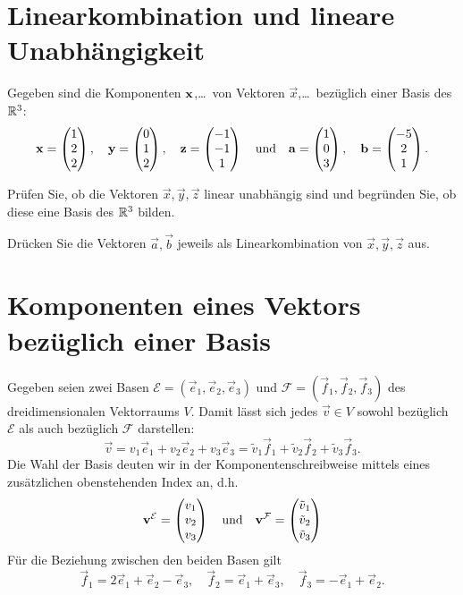 \documentclass{scrartcl}
\newcommand{\ee}{\vec{e}}
\newcommand{\ff}{\vec{f}}
\begin{document}
\section{Linearkombination und lineare Unabhängigkeit }
Gegeben sind die Komponenten $\mathbf{x}$,\ldots\ von Vektoren $\vec{x}$,\ldots\ bezüglich einer Basis des $\mathbb{R}^3$:
\[
  \mathbf{x} = \begin{pmatrix} 1 \\ 2 \\ 2 \end{pmatrix}, \quad
  \mathbf{y} = \begin{pmatrix} 0 \\ 1 \\ 2 \end{pmatrix}, \quad
  \mathbf{z} = \begin{pmatrix} -1 \\ -1 \\ 1 \end{pmatrix} \quad \textrm{und} \quad
  \mathbf{a} = \begin{pmatrix} 1 \\ 0 \\ 3 \end{pmatrix}, \quad
  \mathbf{b} = \begin{pmatrix} -5 \\ 2 \\ 1 \end{pmatrix}.
\]
\begin{subex}
   \item{} Prüfen Sie, ob die Vektoren $\vec{x} , \vec{y} , \vec{z}$ linear unabhängig sind und begründen Sie, ob diese eine Basis des $\mathbb{R}^3$ bilden.
   \item{} Drücken Sie die Vektoren $\vec{a}, \vec{b}$ jeweils als Linearkombination von $\vec{x} , \vec{y} , \vec{z}$ aus.
 \end{subex}



\section{Komponenten eines Vektors bezüglich einer Basis }
Gegeben seien zwei Basen $\mathcal{E} = (\ee_1, \ee_2, \ee_3)$ und $\mathcal{F} = (\ff_1,\ff_2,\ff_3)$ des dreidimensionalen Vektorraums $V$.
Damit lässt sich jedes $\vec{v} \in V$ sowohl bezüglich $\mathcal{E}$ als auch bezüglich $\mathcal{F}$ darstellen:
\[
  \label{eq:basis}\tag{+}  
  \vec{v} = v_1 \ee_1 + v_2 \ee_2 + v_3 \ee_3 = \tilde{v}_1 \ff_1 + \tilde{v}_2 \ff_2 + \tilde{v}_3 \ff_3.
\]
Die Wahl der Basis deuten wir in der Komponentenschreibweise mittels eines zusätzlichen obenstehenden Index an, d.h.
\[
  \mathbf{v}^\mathcal{E} = \begin{pmatrix}v_1 \\ v_2 \\ v_3\end{pmatrix} \quad\mbox{und}\quad
  \mathbf{v}^\mathcal{F} = \begin{pmatrix}\tilde{v}_1 \\ \tilde{v}_2 \\ \tilde{v}_3\end{pmatrix} 
\]
Für die Beziehung zwischen den beiden Basen gilt
\[
  \ff_1 = 2 \ee_1 + \ee_2 - \ee_3, \quad 
  \ff_2 = \ee_1 + \ee_3, \quad
  \ff_3 = -\ee_1 + \ee_2.
\]
\end{document}
